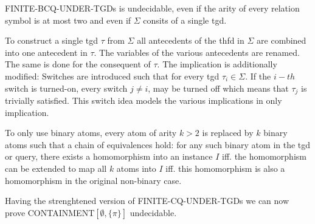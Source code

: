 \begin{theorem}\label{fundplus}
	FINITE-BCQ-UNDER-TGDs is undecidable, even if the arity of every relation
	symbol is at most two and even if $\Sigma$ consits of a single tgd.
\end{theorem}

\begin{proofidea}
To construct a single tgd $\tau$ from $\Sigma$ all antecedents of the thfd in
$\Sigma$ are combined into one antecedent in $\tau$. The variables of the
various antecedents are renamed. The same is done for the consequent of $\tau$.
The implication is additionally modified: Switches are introduced such that for
every tgd $\tau_i \in \Sigma$. If the $i-th$ switch is turned-on, every switch
$j\neq i$, may be turned off which means that $\tau_j$ is trivially satisfied.
This switch idea models the various implications in only implication.

To only use binary atoms, every atom of arity $k>2$ is replaced by $k$ binary
atoms such that a chain of equivalences hold: for any such binary atom in the
tgd or query, there exists a homomorphism into an instance $I$ iff. the
homomorphism can be extended to map all $k$ atoms into $I$ iff. this
homomorphism is also a homomorphism in the original non-binary case.
\end{proofidea}

Having the strenghtened version of FINITE-CQ-UNDER-TGDs we can now prove
CONTAINMENT$[\emptyset,\{\pi\}]$ undecidable.

